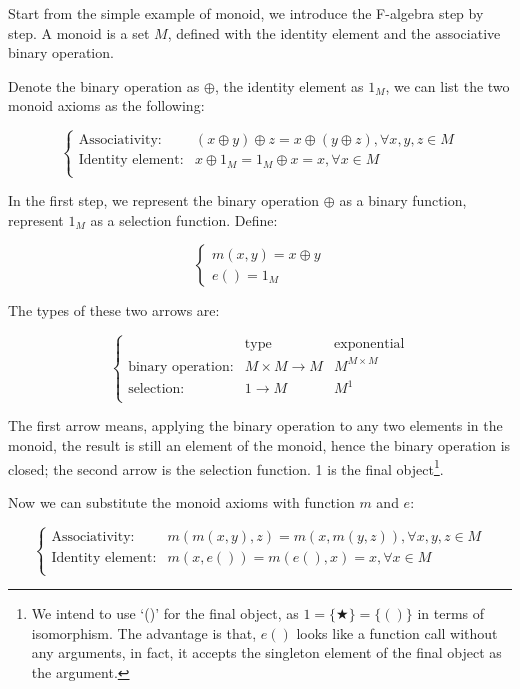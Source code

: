 \documentclass[b5paper]{article}
\begin{document}
\begin{example}
\normalfont
Start from the simple example of monoid, we introduce the F-algebra step by step. A monoid is a set $M$, defined with the identity element and the associative binary operation.

Denote the binary operation as $\oplus$, the identity element as $1_M$, we can list the two monoid axioms as the following:

\[
\begin{cases}
\text{Associativity:} & (x \oplus y) \oplus z = x \oplus (y \oplus z), \forall x, y, z \in M \\
\text{Identity element:} & x \oplus 1_M = 1_M \oplus x = x, \forall x \in M \\
\end{cases}
\]

In the first step, we represent the binary operation $\oplus$ as a binary function, represent $1_M$ as a selection function. Define:

\[
\begin{cases}
m (x, y) = x \oplus y \\
e () = 1_M
\end{cases}
\]

The types of these two arrows are:

\[
\left \{
\begin{array}{lll}
 & \text{type} & \text{exponential} \\
\text{binary operation:} & M \times M \to M & M^{M \times M}\\
\text{selection:} & 1 \to M & M^1 \\
\end{array}
\right .
\]

The first arrow means, applying the binary operation to any two elements in the monoid, the result is still an element of the monoid, hence the binary operation is closed; the second arrow is the selection function. 1 is the final object\footnote{We intend to use `()' for the final object, as $1 = \{ \bigstar \} = \{ () \}$ in terms of isomorphism. The advantage is that, $e()$ looks like a function call without any arguments, in fact, it accepts the singleton element of the final object as the argument.}.

Now we can substitute the monoid axioms with function $m$ and $e$:

\[
\begin{cases}
\text{Associativity:} & m(m(x, y), z) = m(x, m(y, z)), \forall x, y, z \in M \\
\text{Identity element:} & m(x, e()) = m(e(), x) = x, \forall x \in M \\
\end{cases}
\]


\end{example}
\end{document}
